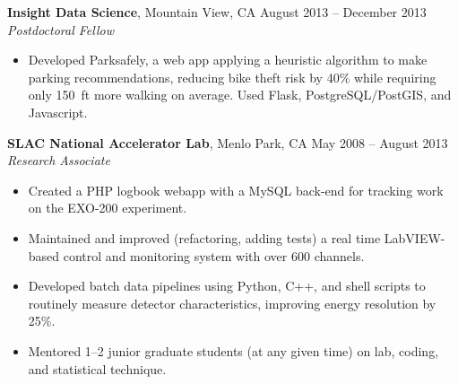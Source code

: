 \documentclass[margin,line]{resume}
\begin{document}
\begin{resume}
    \textbf{Insight Data Science}, Mountain View, CA \hfill August 2013 -- December 2013\vspace{1mm}\\\vspace{1mm}%
    \textsl{Postdoctoral Fellow}
    \begin{itemize}
    \item Developed Parksafely, a web app applying a heuristic algorithm to make parking recommendations, reducing bike theft risk by 40\% while requiring only 150~ft more walking on average. Used Flask, PostgreSQL/PostGIS, and Javascript.
    \end{itemize}

    \textbf{SLAC National Accelerator Lab}, Menlo Park, CA \hfill May 2008 -- August 2013\vspace{1mm}\\\vspace{1mm}%
    \textsl{Research Associate}
    \begin{itemize}
    \item Created a PHP logbook webapp with a MySQL back-end for tracking work on the EXO-200 experiment.
    \item Maintained and improved (refactoring, adding tests) a real time LabVIEW-based control and monitoring system with over 600 channels.
    \item Developed batch data pipelines using Python, C++, and shell scripts to routinely measure detector characteristics, improving energy resolution by 25\%.
    \item Mentored 1--2 junior graduate students (at any given time) on lab, coding, and statistical technique.
    \end{itemize}
    
    

\end{resume}
\end{document}
